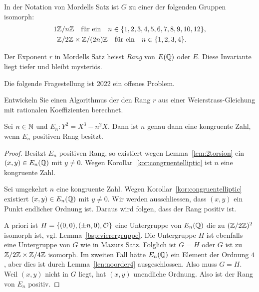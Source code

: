 \begin{satz}[Mazur (1978)] 
  In der Notation von Mordells Satz ist $G$ zu einer der folgenden
  Gruppen isomorph:
  \begin{alignat*}1
    &\IZ/n\IZ \quad\text{für ein}\quad n\in
    \{1,2,3,4,5,6,7,8,9,10,12\},\\
    &\IZ/2\IZ\times\IZ/(2n)\IZ \quad\text{für ein}\quad n\in\{1,2,3,4\}.\\
  \end{alignat*}
\end{satz}

Der Exponent $r$ in Mordells Satz heisst \emph{Rang} von
$E({\mathbb{Q}})$ oder $E$. Diese Invariante liegt tiefer und bleibt mysteriös.

Die folgende Fragestellung ist 2022 ein offenes Problem.

\begin{problem}
  Entwickeln Sie einen Algorithmus der den Rang $r$ aus einer
  Weierstrass-Gleichung mit rationalen Koeffizienten berechnet. 
\end{problem}

\begin{satz}
  Sei $n\in{\mathbb{N}}$ und $E_n : Y^2=X^3-n^2X$. Dann ist $n$ genau dann eine
  kongruente Zahl, wenn $E_n$ positiven Rang besitzt. 
\end{satz}
\begin{proof}
  Besitzt $E_n$ positiven Rang, so existiert wegen
  Lemma~\ref{lem:2torsion} ein  $(x,y)\in E_n({\mathbb{Q}})$ mit
  $y\not=0$. Wegen Korollar~\ref{kor:congruentelliptic} ist $n$ eine
  kongruente Zahl.

  Sei umgekehrt $n$ eine kongruente Zahl. Wegen
  Korollar~\ref{kor:congruentelliptic} existiert $(x,y)\in E_n({\mathbb{Q}})$
  mit $y\not=0$. Wir werden ausschliessen, dass $(x,y)$ ein Punkt
  endlicher Ordnung ist. Daraus wird folgen, dass der Rang positiv
  ist.

  A priori ist $H=\{(0,0),(\pm n,0),{\mathcal O}\}$ eine Untergruppe von
  $E_n({\mathbb{Q}})$ die zu $({\mathbb{Z}}/2{\mathbb{Z}})^2$ isomorph ist, vgl.
  Lemma~\ref{bsp:vierergruppe}. Die Untergruppe $H$ ist ebenfalls eine
  Untergruppe von $G$ wie in Mazurs Satz. Folglich ist  $G=H$ oder $G$
  ist zu ${\mathbb{Z}}/2{\mathbb{Z}}\times{\mathbb{Z}}/4{\mathbb{Z}}$ isomorph.
  Im zweiten Fall hätte $E_n({\mathbb{Q}})$ ein Element der Ordnung $4$, aber
  dies ist durch Lemma~\ref{len:noorder4} ausgeschlossen. Also muss
  $G=H$. Weil $(x,y)$ nicht in $G$ liegt, hat $(x,y)$ unendliche
  Ordnung. Also ist der Rang von $E_n$ positiv. 
\end{proof}

